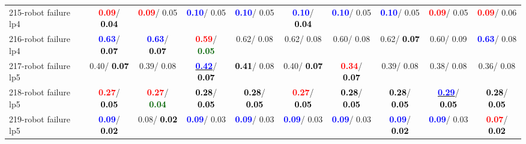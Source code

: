 \begin{table}[h]
\begin{center}
{\begin{tabular}{lc|c|c|c|c|c|c|c|c}
215-robot failure lp4 & \textcolor{red}{\textbf{  0.09}}/\textcolor{black}{\textbf{  0.04}} & \textcolor{red}{\textbf{  0.09}}/  0.05 & \textcolor{blue}{\textbf{  0.10}}/  0.05 & \textcolor{blue}{\textbf{  0.10}}/  0.05 & \textcolor{blue}{\textbf{  0.10}}/\textcolor{black}{\textbf{  0.04}} & \textcolor{blue}{\textbf{  0.10}}/  0.05 & \textcolor{blue}{\textbf{  0.10}}/  0.05 & \textcolor{red}{\textbf{  0.09}}/  0.05 & \textcolor{red}{\textbf{  0.09}}/  0.06 \\
216-robot failure lp4 & \textcolor{blue}{\textbf{  0.63}}/\textcolor{black}{\textbf{  0.07}} & \textcolor{blue}{\textbf{  0.63}}/\textcolor{black}{\textbf{  0.07}} & \textcolor{red}{\textbf{  0.59}}/\textcolor{darkgreen}{\textbf{  0.05}} &   0.62/  0.08 &   0.62/  0.08 &   0.60/  0.08 &   0.62/\textcolor{black}{\textbf{  0.07}} &   0.60/  0.09 & \textcolor{blue}{\textbf{  0.63}}/  0.08 \\
217-robot failure lp5 &   0.40/\textcolor{black}{\textbf{  0.07}} &   0.39/  0.08 & \underline{\textcolor{blue}{\textbf{  0.42}}}/\textcolor{black}{\textbf{  0.07}} & \textcolor{black}{\textbf{  0.41}}/  0.08 &   0.40/\textcolor{black}{\textbf{  0.07}} & \textcolor{red}{\textbf{  0.34}}/\textcolor{black}{\textbf{  0.07}} &   0.39/  0.08 &   0.38/  0.08 &   0.36/  0.08 \\
218-robot failure lp5 & \textcolor{red}{\textbf{  0.27}}/\textcolor{black}{\textbf{  0.05}} & \textcolor{red}{\textbf{  0.27}}/\textcolor{darkgreen}{\textbf{  0.04}} & \textcolor{black}{\textbf{  0.28}}/\textcolor{black}{\textbf{  0.05}} & \textcolor{black}{\textbf{  0.28}}/\textcolor{black}{\textbf{  0.05}} & \textcolor{red}{\textbf{  0.27}}/\textcolor{black}{\textbf{  0.05}} & \textcolor{black}{\textbf{  0.28}}/\textcolor{black}{\textbf{  0.05}} & \textcolor{black}{\textbf{  0.28}}/\textcolor{black}{\textbf{  0.05}} & \underline{\textcolor{blue}{\textbf{  0.29}}}/\textcolor{black}{\textbf{  0.05}} & \textcolor{black}{\textbf{  0.28}}/\textcolor{black}{\textbf{  0.05}} \\
219-robot failure lp5 & \textcolor{blue}{\textbf{  0.09}}/\textcolor{black}{\textbf{  0.02}} &   0.08/\textcolor{black}{\textbf{  0.02}} & \textcolor{blue}{\textbf{  0.09}}/  0.03 & \textcolor{blue}{\textbf{  0.09}}/  0.03 & \textcolor{blue}{\textbf{  0.09}}/  0.03 & \textcolor{blue}{\textbf{  0.09}}/  0.03 & \textcolor{blue}{\textbf{  0.09}}/\textcolor{black}{\textbf{  0.02}} & \textcolor{blue}{\textbf{  0.09}}/  0.03 & \textcolor{red}{\textbf{  0.07}}/\textcolor{black}{\textbf{  0.02}} \\

\end{tabular}}
\end{center}
\end{table}
